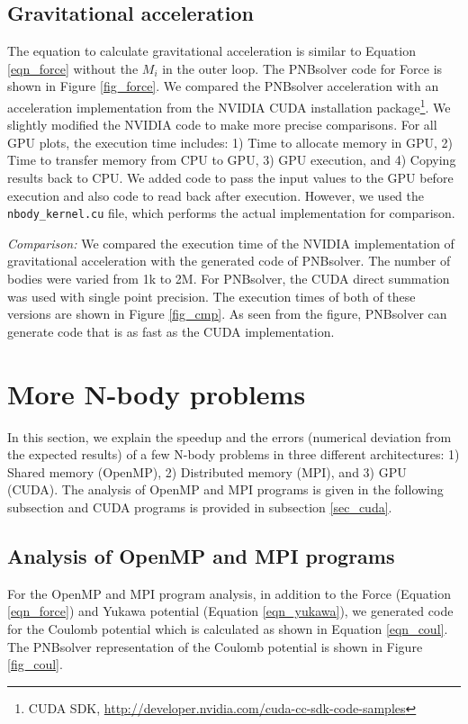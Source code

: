 \documentclass[draftclsnofoot]{elsarticle}
\begin{document}
\subsection{Gravitational acceleration}
The equation to calculate gravitational acceleration is similar to Equation \ref{eqn_force} without the $M_i$ in the outer loop. The PNBsolver code  for Force is 
shown in Figure \ref{fig_force}. We compared the PNBsolver acceleration with an acceleration implementation from the NVIDIA CUDA installation 
package\footnote{CUDA SDK, \url{http://developer.nvidia.com/cuda-cc-sdk-code-samples}}. We slightly modified the NVIDIA code to make more precise comparisons. For all
GPU plots, the execution time includes: 1) Time to allocate memory in GPU, 2) Time to transfer memory from CPU to GPU, 3) GPU execution, and 4) Copying results back
to CPU. We  added code to pass the input values to the GPU before execution and also code to read back after execution. However, we used the 
\texttt{nbody\_kernel.cu} file, which performs  the actual implementation for comparison. 

\textit{Comparison: }
We compared the execution time of the NVIDIA implementation of gravitational acceleration with the generated code of PNBsolver. The number of bodies were varied from 1k to
2M. For PNBsolver, the CUDA direct summation was used with single point precision. The execution times of both of these versions are shown in Figure \ref{fig_cmp}. 
As seen from the figure, PNBsolver can generate code that is as fast as the CUDA implementation. 












\section{More N-body problems}
\label{sec_more}

In this section, we explain the speedup and the errors (numerical deviation from the expected results) of a few N-body problems in three different architectures: 1) Shared memory (OpenMP), 
2) Distributed memory (MPI),  and 3) GPU (CUDA). The analysis of OpenMP and MPI programs is given in the following subsection and CUDA programs is provided in 
subsection \ref{sec_cuda}.

\subsection{Analysis of OpenMP and MPI programs}
For the OpenMP and MPI program analysis, in addition to the Force (Equation \ref{eqn_force}) and  Yukawa potential (Equation \ref{eqn_yukawa}), we generated code for the 
Coulomb potential which is calculated as shown in Equation \ref{eqn_coul}. The PNBsolver representation of the Coulomb potential is shown in Figure \ref{fig_coul}. 
\end{document}
